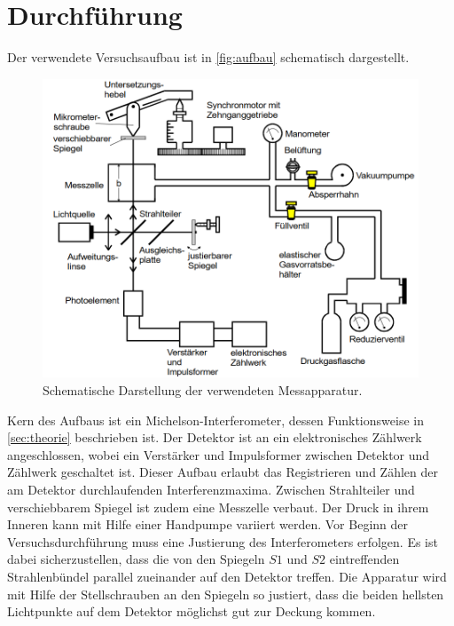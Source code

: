 \section{Durchführung}
\label{sec:Durchführung}

Der verwendete Versuchsaufbau ist in \autoref{fig:aufbau} schematisch dargestellt.

\begin{figure}
    \centering
    \includegraphics{content/aufbau.png}
    \caption{Schematische Darstellung der verwendeten Messapparatur.}
    \label{fig:aufbau}
  \end{figure}

Kern des Aufbaus ist ein Michelson-Interferometer, dessen Funktionsweise in \autoref{sec:theorie} beschrieben ist.
Der Detektor ist an ein elektronisches Zählwerk angeschlossen, wobei ein Verstärker und Impulsformer zwischen Detektor und 
Zählwerk geschaltet ist. Dieser Aufbau erlaubt das Registrieren und Zählen der am Detektor durchlaufenden Interferenzmaxima. 
Zwischen Strahlteiler und verschiebbarem Spiegel ist zudem eine Messzelle verbaut. Der Druck in ihrem Inneren kann mit Hilfe
einer Handpumpe variiert werden. 
Vor Beginn der Versuchsdurchführung muss eine Justierung des Interferometers erfolgen. Es ist dabei sicherzustellen,
dass die von den Spiegeln $S1$ und $S2$ eintreffenden Strahlenbündel parallel zueinander auf den Detektor treffen. 
Die Apparatur wird mit Hilfe der Stellschrauben an den Spiegeln so justiert, dass die beiden hellsten Lichtpunkte 
auf dem Detektor möglichst gut zur Deckung kommen. 

